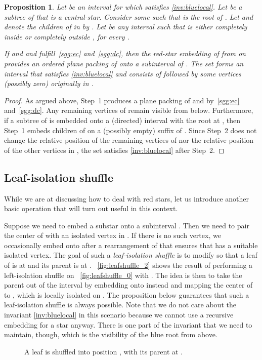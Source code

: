 \documentclass[11pt,a4paper,colorlinks=true,urlcolor=blue,citecolor=red]{article}
\theoremstyle{plain}
\newtheorem{proposition}[theorem]{Proposition}
\begin{document}
\begin{proposition}\label{prop:stargreedygrab}
  Let  be an interval for which  satisfies
  \ref{inv:bluelocal}. Let  be a subtree of  that is a
  central-star. Consider some  such that  is the
  root of . Let  and denote the
  children of  in  by . Let
   be any interval such that
   is either completely inside or completely outside ,
  for every .

  If  and  and  fulfill~\ref{sgg:ec}
  and~\ref{sgg:dc}, then the red-star embedding of  from 
  on  provides an ordered plane packing of  onto a subinterval
   of . The set  forms an interval that satisfies
  \ref{inv:bluelocal} and consists of  followed by some
  vertices (possibly zero) originally in .
\end{proposition}
\begin{proof}
  As argued above, Step~1 produces a plane packing of  and 
  by~\ref{sgg:ec} and~\ref{sgg:dc}. Any remaining vertices of
   remain visible from below. Furthermore, if a
  subtree of  is embedded onto a (directed)
  interval  with the root at , then Step~1 embeds children of
   on a (possibly empty) suffix of . Since Step~2 does not
  change the relative position of the remaining vertices of
   nor the relative position of the other
  vertices in , the set  satisfies
  \ref{inv:bluelocal} after Step~2.
\end{proof}

\subsection{Leaf-isolation shuffle}
While we are at discussing how to deal with red stars, let us introduce
another basic operation that will turn out useful in this context.

Suppose we need to embed a substar  onto a subinterval
. Then we need to pair the center of  with an
isolated vertex in . If there is no such vertex, we occasionally
embed  onto  after a rearrangement of  that ensures
that  has a suitable isolated vertex. The goal of such a
\emph{leaf-isolation shuffle} is to modify  so that a leaf of
 is at  and its parent is at
. \figurename~\ref{fig:leafshuffle_2} shows the result of performing
a left-isolation shuffle on \figurename~\ref{fig:leafshuffle_0} with
. The idea is then to take the parent out of the interval
by embedding  onto  instead and mapping the center of
 to , which is locally isolated on . The
proposition below guarantees that such a leaf-isolation shuffle is
always possible. Note that we do not care about the invariant
\ref{inv:bluelocal} in this scenario because we cannot use a recursive
embedding for a star anyway. There is one part of the invariant that we
need to maintain, though, which is the visibility of the blue root from
above.
\begin{figure}[htbp]
  \centering\hfil {}\hfil
  \hfil
  \hfil
  \caption{A leaf is shuffled into position , with its parent at
    .\label{fig:leafshuffle}}
\end{figure}
\end{document}
